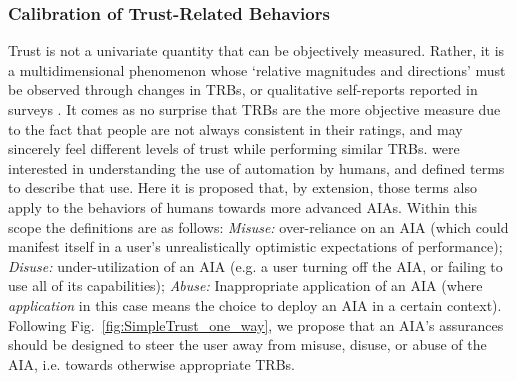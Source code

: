 \subsubsection{Calibration of Trust-Related Behaviors}
    Trust is not a univariate quantity that can be objectively measured. Rather, it is a multidimensional phenomenon whose `relative magnitudes and directions' must be observed through changes in TRBs, or qualitative self-reports reported in surveys \cite{Muir1996-gt}. It comes as no surprise that TRBs are the more objective measure due to the fact that people are not always consistent in their ratings, and may sincerely feel different levels of trust while performing similar TRBs. \citet{Parasuraman1997-co} were interested in understanding the use of automation by humans, and defined terms to describe that use. Here it is proposed that, by extension, those terms also apply to the behaviors of humans towards more advanced AIAs. Within this scope the definitions are as follows: \textit{Misuse:} over-reliance on an AIA (which could manifest itself in a user's unrealistically optimistic expectations of performance); \textit{Disuse:} under-utilization of an AIA (e.g. a user turning off the AIA, or failing to use all of its capabilities); \textit{Abuse:} Inappropriate application of an AIA (where \emph{application} in this case means the choice to deploy an AIA in a certain context). %
%    
%
%
Following Fig.~\ref{fig:SimpleTrust_one_way}, we propose that an AIA's assurances should be designed to steer the user away from misuse, disuse, or abuse of the AIA, i.e. towards otherwise appropriate TRBs. %
